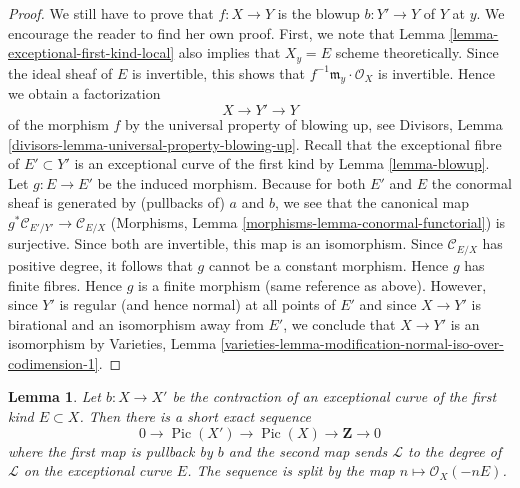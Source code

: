 \documentclass{stacks-project}
\theoremstyle{plain}
\newtheorem{lemma}[subsection]{Lemma}
\theoremstyle{definition}
\theoremstyle{remark}
\numberwithin{equation}{subsection}
\def\Pic{\mathop{\mathrm{Pic}}\nolimits}
\begin{document}
\begin{proof}
\medskip\noindent
We still have to prove that $f : X \to Y$ is the blowup $b : Y' \to Y$
of $Y$ at $y$. We encourage the reader to find her own proof.
First, we note that Lemma \ref{lemma-exceptional-first-kind-local}
also implies that $X_y = E$ scheme theoretically.
Since the ideal sheaf of $E$ is invertible, this shows
that $f^{-1}\mathfrak m_y \cdot \mathcal{O}_X$ is invertible.
Hence we obtain a factorization
$$
X \to Y' \to Y
$$
of the morphism $f$ by the universal property of blowing up, see
Divisors, Lemma \ref{divisors-lemma-universal-property-blowing-up}.
Recall that the exceptional fibre of $E' \subset Y'$ is an exceptional
curve of the first kind by Lemma \ref{lemma-blowup}.
Let $g : E \to E'$ be the induced morphism.
Because for both $E'$ and $E$ the conormal sheaf is generated
by (pullbacks of) $a$ and $b$, we see that the canonical map
$g^*\mathcal{C}_{E'/Y'} \to \mathcal{C}_{E/X}$
(Morphisms, Lemma \ref{morphisms-lemma-conormal-functorial})
is surjective. Since both are invertible, this map is an isomorphism.
Since $\mathcal{C}_{E/X}$ has positive degree, it follows that $g$
cannot be a constant morphism.
Hence $g$ has finite fibres. Hence $g$ is a finite morphism
(same reference as above). However, since $Y'$ is regular
(and hence normal) at all points of $E'$ and since $X \to Y'$
is birational and an isomorphism away from $E'$, we conclude
that $X \to Y'$ is an isomorphism by
Varieties, Lemma
\ref{varieties-lemma-modification-normal-iso-over-codimension-1}.
\end{proof}

\begin{lemma}
\label{lemma-pic-blowup}
Let $b : X \to X'$ be the contraction of an
exceptional curve of the first kind $E \subset X$.
Then there is a short exact sequence
$$
0 \to \Pic(X') \to \Pic(X) \to \mathbf{Z} \to 0
$$
where the first map is pullback by $b$ and the second map sends
$\mathcal{L}$ to the degree of $\mathcal{L}$ on the exceptional
curve $E$. The sequence is split by the map
$n \mapsto \mathcal{O}_X(-nE)$.
\end{lemma}
\end{document}
